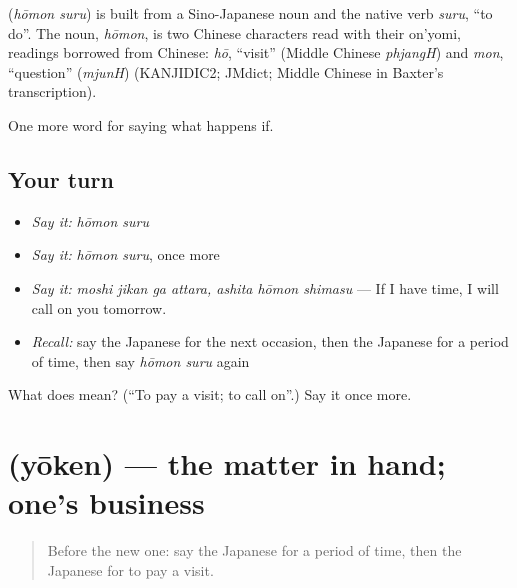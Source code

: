 \begin{cousinweb}
\textbf{} (\emph{hōmon suru}) is built from a Sino-Japanese noun and the native verb \emph{suru}, \textquotedblleft{}to do\textquotedblright{}. The noun, \emph{hōmon}, is two Chinese characters read with their on'yomi, readings borrowed from Chinese: \emph{hō}, \textquotedblleft{}visit\textquotedblright{} (Middle Chinese \emph{phjangH}) and \emph{mon}, \textquotedblleft{}question\textquotedblright{} (\emph{mjunH}) (KANJIDIC2; JMdict; Middle Chinese in Baxter's transcription).
\end{cousinweb}

\begin{grammarlens}[title={What you've built}]
One more word for saying what happens if.
\end{grammarlens}

\subsection*{Your turn}
\begin{itemize}
\raggedright
  \item \emph{Say it:} \emph{hōmon suru}
  \item \emph{Say it:} \emph{hōmon suru}, once more
  \item \emph{Say it:} \emph{moshi jikan ga attara, ashita hōmon shimasu} — If I have time, I will call on you tomorrow.
  \item \emph{Recall:} say the Japanese for the next occasion, then the Japanese for a period of time, then say \emph{hōmon suru} again
\end{itemize}

\begin{tcolorbox}[breakable,colback=teal!4,colframe=teal!35!black,title={Before you move on}]
What does  mean? (\textquotedblleft{}To pay a visit; to call on\textquotedblright{}.) Say it once more.
\end{tcolorbox}
\section[\texorpdfstring{\ja{ようけん} (yōken)}{ようけん (yōken)}]{ (yōken) — the matter in hand; one's business}

\label{lesson:JA-C347-youken}



\begin{quote}
Before the new one: say the Japanese for a period of time, then the Japanese for to pay a visit.
\end{quote}

